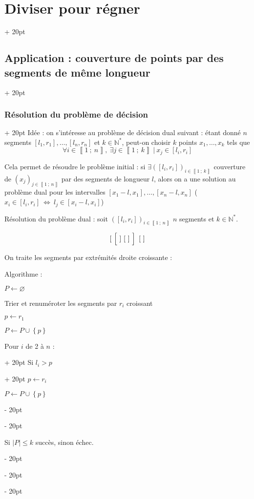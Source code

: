 \documentclass[a4paper, 12pt, twoside]{article}
\newcommand{\N}{\mathbb{N}} %
\newcommand{\nset}[2]{\left\llbracket #1\ ;\ #2 \right\rrbracket}
\newcommand{\set}[1]{\left\{ #1 \right\}}
\newcommand{\abs}[1]{\left\lvert #1 \right\rvert} %
\newcommand{\ssi}{\ \Leftrightarrow \ }
\renewcommand{\le}{\leqslant}
\newcommand{\ind}[1][20pt]{\advance\leftskip + #1}
\newcommand{\deind}[1][20pt]{\advance\leftskip - #1}
\newenvironment{indt}[2][20pt]{#2 \par \ind[#1]}{\par \deind} %
\begin{document}
\begin{indt}{\section{Diviser pour régner}}
\begin{indt}{\subsection{Application : couverture de points par des segments de même longueur}}
\begin{indt}{\subsubsection{Résolution du problème de décision}}
                Idée : on s'intéresse au problème de décision dual suivant : étant donné $n$ segments $[l_1, r_1], \ldots, [l_n, r_n]$ et $k \in \N^*$, peut-on choisir $k$ points $x_1, \ldots, x_k$ tels que
                    \[ \forall i \in \nset 1 n,\ \exists j \in \nset 1 k\ |\ x_j \in [l_i, r_i] \]
                
                Cela permet de résoudre le problème initial : si $\exists ([l_i, r_i])_{i \in \nset 1 k}$ couverture de $(x_j)_{j \in \nset 1 n}$ par des segments de longueur $l$, alors on a une solution au problème dual pour les intervalles $[x_1 - l, x_1], \ldots, [x_n - l, x_n]$ ($x_i \in [l_i, r_i] \ssi l_j \in [x_i - l, x_i]$)
                
                \vspace{6pt}
                
                Résolution du problème dual : soit $([l_i, r_i])_{i \in \nset 1 n}$ $n$ segments et $k \in \N^*$.
                
                    \[ [\ \left[\ \vphantom{\dfrac a a} ]\ [\ ]\ \right]\ [\ ] \]
                
                On traite les segments par extrémités droite croissante :
                
                Algorithme :
                \begin{pseudocode}
                    $P \leftarrow \varnothing$
                    
                    Trier et renuméroter les segments par $r_i$ croissant
                    
                    $p \leftarrow r_1$
                    
                    $P \leftarrow P \cup \set p$
                    
                    \begin{indt}{Pour $i$ de 2 à $n$ :}
                        \begin{indt}{Si $l_i > p$}
                            $p \leftarrow r_i$
                            
                            $P \leftarrow P \cup \set p$
                        \end{indt}
                    \end{indt}
                    
                    Si $\abs P \le k$ succès, sinon échec.
                \end{pseudocode}
                

\end{indt}
\end{indt}
\end{indt}
\end{document}
